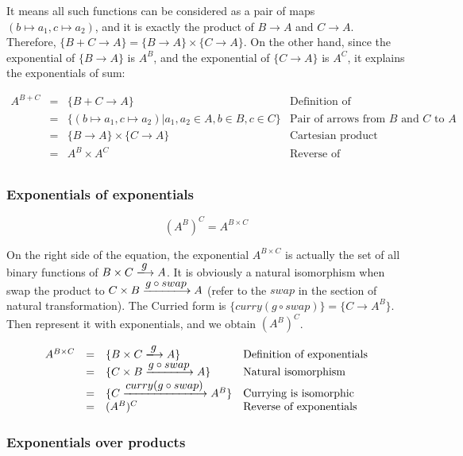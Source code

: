 \documentclass[b5paper]{article}
\begin{document}
It means all such functions can be considered as a pair of maps $(b \mapsto a_1, c \mapsto a_2)$, and it is exactly the product of $B \to A$ and $C \to A$. Therefore, $\{B + C \to A\} = \{B \to A\} \times \{C \to A\}$. On the other hand, since the exponential of $\{B \to A\}$ is $A^B$, and the exponential of $\{C \to A\}$ is $A^C$, it explains the exponentials of sum:

\[
\begin{array}{rcll}
A^{B + C} & = & \{ B + C \to A \} & \text{Definition of exponentials} \\
    & = & \{ (b \mapsto a_1,  c \mapsto a_2) | a_1, a_2 \in A, b \in B, c \in C\} & \text{Pair of arrows from $B$ and $C$ to $A$} \\
    & = & \{ B \to A \} \times \{ C \to A \} & \text{Cartesian product} \\
    & = & A^B \times A^C & \text{Reverse of exponentials} \\
\end{array}
\]

\subsubsection{Exponentials of exponentials}

\[
  (A^B)^C = A^{B \times C}
\]

On the right side of the equation, the exponential $A^{B \times C}$ is actually the set of all binary functions of $B \times C \arrowto{g} A$. It is obviously a natural isomorphism when swap the product to $C \times B \arrowto{g \circ swap} A$ (refer to the $swap$ in the section of natural transformation). The Curried form is $\{curry(g \circ swap)\} = \{C \to A^B\}$. Then represent it with exponentials, and we obtain $(A^B)^C$.

\[
\begin{array}{rcll}
A^{B \times C} & = & \{B \times C \arrowto{g} A \}  & \text{Definition of exponentials} \\
    & = & \{ C \times B \arrowto{g \circ swap} A \} & \text{Natural isomorphism} \\
    & = & \{ C \arrowto{curry(g \circ swap)} A^B \} & \text{Currying is isomorphic} \\
    & = & (A^B)^C & \text{Reverse of exponentials} \\
\end{array}
\]

\subsubsection{Exponentials over products}
\end{document}

